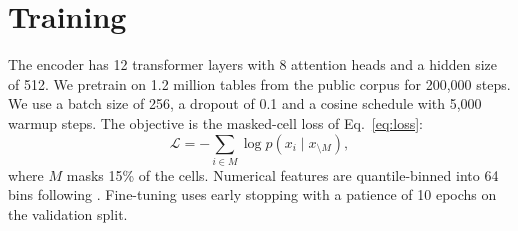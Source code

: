 \section{Training}
\label{sec:training}
The encoder has 12 transformer layers with 8 attention heads and a hidden size of 512.
We pretrain on 1.2 million tables from the public corpus \cite{corpus2024} for 200,000 steps.
We use a batch size of 256, a dropout of 0.1 and a cosine schedule with 5,000 warmup steps.
The objective is the masked-cell loss of Eq.~\ref{eq:loss}:
\begin{equation}
\mathcal{L} = -\sum_{i \in M} \log p(x_i \mid x_{\setminus M}),
\label{eq:loss}
\end{equation}
where $M$ masks 15\% of the cells.
Numerical features are quantile-binned into 64 bins following \cite{gorishniy2022}.
Fine-tuning uses early stopping with a patience of 10 epochs on the validation split.
